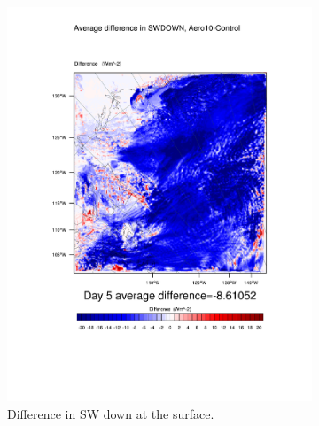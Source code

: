 \begin{figure}
\centering
	\begin{subfigure}{0.48\textwidth}
		\includegraphics[width=\textwidth]{results/aero10/diff_Aero10_SWDOWN_Day5.pdf}
		\caption{Difference in SW down at the surface.}
		\label{subfig:swdown_r3Day5}
	\end{subfigure}
	\quad
	\begin{subfigure}{0.48\textwidth}
		\centering

\end{subfigure}
\end{figure}
